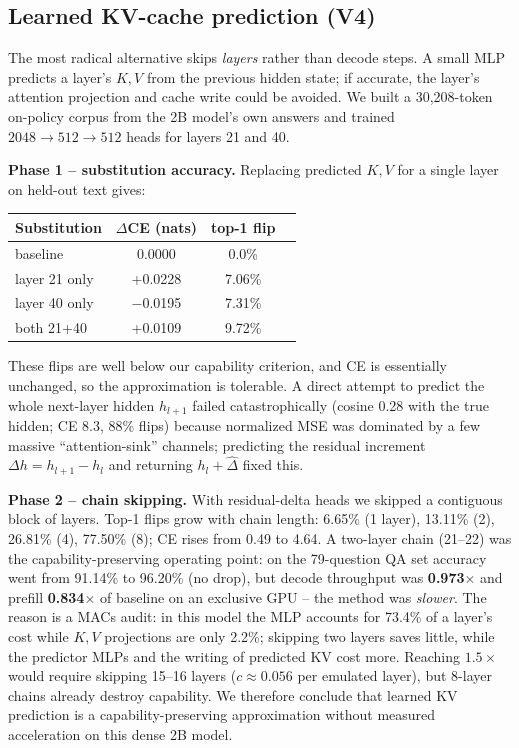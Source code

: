 \documentclass[11pt,a4paper]{article}
\begin{document}
\subsection{Learned KV-cache prediction (V4)}
The most radical alternative skips \emph{layers} rather than decode steps. A small MLP predicts a
layer's $K,V$ from the previous hidden state; if accurate, the layer's attention projection and
cache write could be avoided. We built a 30,208-token on-policy corpus from the 2B model's own
answers and trained $2048\!\to\!512\!\to\!512$ heads for layers 21 and 40.

\noindent\textbf{Phase 1 -- substitution accuracy.} Replacing predicted $K,V$ for a single layer
on held-out text gives:

\begin{center}
\begin{tabular}{lccc}
\toprule
Substitution & $\Delta$CE (nats) & top-1 flip & \\
\midrule
baseline & 0.0000 & 0.0\% & \\
layer 21 only & +0.0228 & 7.06\% & \\
layer 40 only & $-$0.0195 & 7.31\% & \\
both 21+40 & +0.0109 & 9.72\% & \\
\bottomrule
\end{tabular}
\end{center}
These flips are well below our capability criterion, and CE is essentially unchanged, so the
approximation is tolerable. A direct attempt to predict the whole next-layer hidden $h_{l+1}$ failed
catastrophically (cosine 0.28 with the true hidden; CE 8.3, 88\% flips) because normalized MSE was
dominated by a few massive ``attention-sink'' channels; predicting the residual increment
$\Delta h = h_{l+1}-h_l$ and returning $h_l+\hat{\Delta}$ fixed this.

\noindent\textbf{Phase 2 -- chain skipping.} With residual-delta heads we skipped a contiguous
block of layers. Top-1 flips grow with chain length: 6.65\% (1 layer), 13.11\% (2), 26.81\% (4),
77.50\% (8); CE rises from 0.49 to 4.64. A two-layer chain (21--22) was the capability-preserving
operating point: on the 79-question QA set accuracy went from 91.14\% to 96.20\% (no drop), but
decode throughput was \textbf{0.973$\times$} and prefill \textbf{0.834$\times$} of baseline on an
exclusive GPU -- the method was \emph{slower}. The reason is a MACs audit: in this model the MLP
accounts for 73.4\% of a layer's cost while $K,V$ projections are only 2.2\%; skipping two layers
saves little, while the predictor MLPs and the writing of predicted KV cost more. Reaching
$1.5\times$ would require skipping 15--16 layers ($c\approx0.056$ per emulated layer), but 8-layer
chains already destroy capability. We therefore conclude that learned KV prediction is a
capability-preserving approximation without measured acceleration on this dense 2B model.
\end{document}
